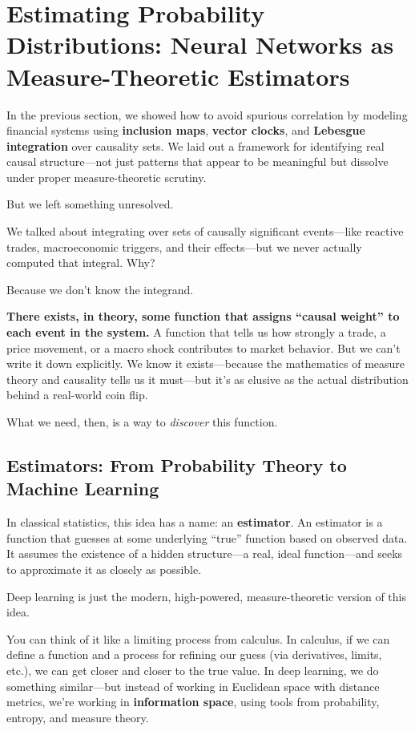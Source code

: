 
\section{Estimating Probability Distributions: Neural Networks as Measure-Theoretic Estimators}

In the previous section, we showed how to avoid spurious correlation by modeling financial systems using \textbf{inclusion maps}, \textbf{vector clocks}, and \textbf{Lebesgue integration} over causality sets. We laid out a framework for identifying real causal structure—not just patterns that appear to be meaningful but dissolve under proper measure-theoretic scrutiny.

But we left something unresolved.

We talked about integrating over sets of causally significant events—like reactive trades, macroeconomic triggers, and their effects—but we never actually computed that integral. Why?

Because we don't know the integrand.

\textbf{There exists, in theory, some function that assigns ``causal weight'' to each event in the system.} A function that tells us how strongly a trade, a price movement, or a macro shock contributes to market behavior. But we can’t write it down explicitly. We know it exists—because the mathematics of measure theory and causality tells us it must—but it’s as elusive as the actual distribution behind a real-world coin flip.

What we need, then, is a way to \textit{discover} this function.

\subsection{Estimators: From Probability Theory to Machine Learning}

In classical statistics, this idea has a name: an \textbf{estimator}. An estimator is a function that guesses at some underlying ``true'' function based on observed data. It assumes the existence of a hidden structure—a real, ideal function—and seeks to approximate it as closely as possible.

Deep learning is just the modern, high-powered, measure-theoretic version of this idea.

You can think of it like a limiting process from calculus. In calculus, if we can define a function and a process for refining our guess (via derivatives, limits, etc.), we can get closer and closer to the true value. In deep learning, we do something similar—but instead of working in Euclidean space with distance metrics, we're working in \textbf{information space}, using tools from probability, entropy, and measure theory.

